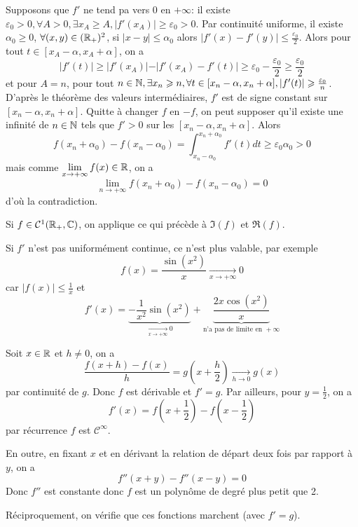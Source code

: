 \begin{solution}
	Supposons que $f'$ ne tend pa vers 0 en $+\infty$: il existe $\varepsilon_{0}>0,\forall A>0,\exists x_{A}\geqslant A,\vert f'(x_{A})\vert\geqslant\varepsilon_{0}>0$. Par continuité uniforme, il existe $\alpha_{0}\geqslant0$, $\forall(x,y)\in(\mathbb{R}_{+})^{2}$, si $\vert x-y\vert\leqslant\alpha_{0}$ alors $\vert f'(x)-f'(y)\vert\leqslant\frac{\varepsilon_{0}}{2}$. Alors pour tout $t\in[x_{A}-\alpha,x_{A}+\alpha]$, on a 
	$$\vert f'(t)\vert\geqslant \vert f'(x_{A})\vert-\vert f'(x_{A})-f'(t)\vert\geqslant\varepsilon_{0}-\frac{\varepsilon_{0}}{2}\geqslant\frac{\varepsilon_{0}}{2}$$
	et pour $A=n$, pour tout $n\in\mathbb{N},\exists x_{n}\geqslant n,\forall t\in[x_{n}-\alpha,x_{n}+\alpha],\vert f'(t)\vert\geqslant\frac{\varepsilon_{0}}{n}$. D'après le théorème des valeurs intermédiaires, $f'$ est de signe constant sur $[x_{n}-\alpha,x_{n}+\alpha]$. Quitte à changer $f$ en $-f$, on peut supposer qu'il existe une infinité de $n\in\mathbb{N}$ tels que $f'>0$ sur les $[x_{n}-\alpha,x_{n}+\alpha]$. Alors
	$$f(x_{n}+\alpha_{0})-f(x_{n}-\alpha_{0})=\int_{x_{n}-\alpha_{0}}^{x_{n}+\alpha_{0}}f'(t)dt\geqslant\varepsilon_{0}\alpha_{0}>0$$
	mais comme $\lim\limits_{x\to+\infty}f(x)\in\mathbb{R}$, on a 
	$$\lim\limits_{n\to+\infty}f(x_{n}+\alpha_{0})-f(x_{n}-\alpha_{0})=0$$
	d'où la contradiction.

	Si $f\in\mathcal{C}^{1}(\mathbb{R}_{+},\mathbb{C})$, on applique ce qui précède à $\Im(f)$ et $\Re(f)$. 

	Si $f'$ n'est pas uniformément continue, ce n'est plus valable, par exemple 
	$$f(x)=\frac{\sin(x^{2})}{x}\xrightarrow[x\to+\infty]{}0$$
	car $\vert f(x)\vert\leqslant\frac{1}{x}$ et 
	$$f'(x)=\underbrace{-\frac{1}{x^{2}}\sin(x^{2})}_{\xrightarrow[x\to+\infty]{}0}+\underbrace{\frac{2x\cos(x^{2})}{x}}_{\text{n'a pas de limite en }+\infty}$$
\end{solution}

\begin{solution}
	Soit $x\in\mathbb{R}$ et $h\neq0$, on a 
	$$\frac{f(x+h)-f(x)}{h}=g(x+\frac{h}{2})\xrightarrow[h\to0]{}g(x)$$
	par continuité de $g$. Donc $f$ est dérivable et $f'=g$. Par ailleurs, pour $y=\frac{1}{2}$, on a 
	$$f'(x)=f(x+\frac{1}{2})-f(x-\frac{1}{2})$$
	par récurrence $f$ est $\mathcal{C}^{\infty}$.

	En outre, en fixant $x$ et en dérivant la relation de départ deux fois par rapport à $y$, on a 
	$$f''(x+y)-f''(x-y)=0$$
	Donc $f''$ est constante donc $f$ est un polynôme de degré plus petit que 2.

	Réciproquement, on vérifie que ces fonctions marchent (avec $f'=g$).
\end{solution}

